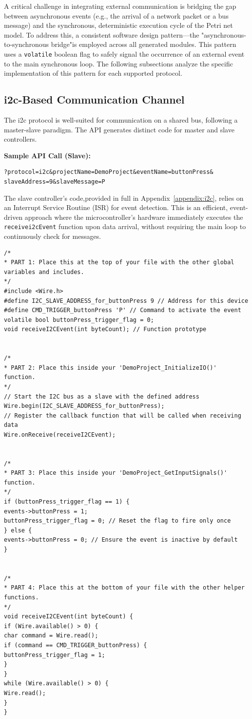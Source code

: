 A critical challenge in integrating external communication is bridging the gap between asynchronous events (e.g., the arrival of a network packet or a bus message) and the synchronous, deterministic execution cycle of the Petri net model. To address this, a consistent software design pattern—the "asynchronous-to-synchronous bridge"is employed across all generated modules. This pattern uses a \texttt{volatile} boolean flag to safely signal the occurrence of an external event to the main synchronous loop. The following subsections analyze the specific implementation of this pattern for each supported protocol.

\subsection{\gls{i2c}-Based Communication Channel}
The \gls{i2c} protocol is well-suited for communication on a shared bus, following a master-slave paradigm. The API generates distinct code for master and slave controllers.

\noindent\textbf{Sample API Call (Slave):}
\begin{verbatim}
?protocol=i2c&projectName=DemoProject&eventName=buttonPress&
slaveAddress=9&slaveMessage=P
\end{verbatim}

The slave controller's code,provided in full in Appendix~\ref{appendix:i2c}, relies on an Interrupt Service Routine (ISR) for event detection. This is an efficient, event-driven approach where the microcontroller's hardware immediately executes the \texttt{receive\gls{i2c}Event} function upon data arrival, without requiring the main loop to continuously check for messages.

\begin{verbatim}
/*
* PART 1: Place this at the top of your file with the other global 
variables and includes.
*/
#include <Wire.h>
#define I2C_SLAVE_ADDRESS_for_buttonPress 9 // Address for this device
#define CMD_TRIGGER_buttonPress 'P' // Command to activate the event
volatile bool buttonPress_trigger_flag = 0;
void receiveI2CEvent(int byteCount); // Function prototype


/*
* PART 2: Place this inside your 'DemoProject_InitializeIO()' function.
*/
// Start the I2C bus as a slave with the defined address
Wire.begin(I2C_SLAVE_ADDRESS_for_buttonPress);
// Register the callback function that will be called when receiving data
Wire.onReceive(receiveI2CEvent);


/*
* PART 3: Place this inside your 'DemoProject_GetInputSignals()' function.
*/
if (buttonPress_trigger_flag == 1) {
events->buttonPress = 1;
buttonPress_trigger_flag = 0; // Reset the flag to fire only once
} else {
events->buttonPress = 0; // Ensure the event is inactive by default
}


/*
* PART 4: Place this at the bottom of your file with the other helper functions.
*/
void receiveI2CEvent(int byteCount) {
if (Wire.available() > 0) {
char command = Wire.read();
if (command == CMD_TRIGGER_buttonPress) {
buttonPress_trigger_flag = 1;
}
}
while (Wire.available() > 0) {
Wire.read();
}
}
\end{verbatim}

